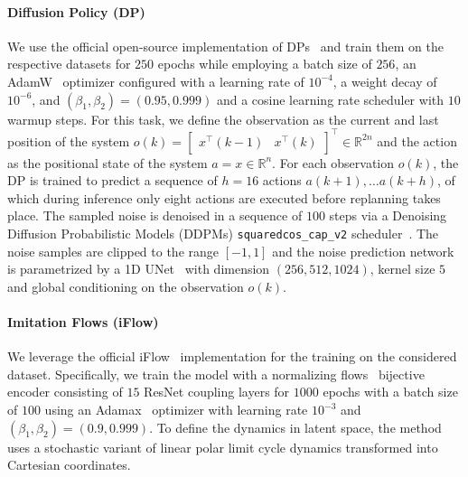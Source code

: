\paragraph{Diffusion Policy (DP)}
We use the official open-source implementation of \glspl{DP}~\citep{chi2023diffusion} and train them on the respective datasets for $250$ epochs while employing a batch size of $256$, an AdamW~\citep{kingma2014adam, loshchilov2018decoupled} optimizer configured with a learning rate of $10^{-4}$, a weight decay of $10^{-6}$, and $(\beta_1, \beta_2) = (0.95, 0.999)$ and a cosine learning rate scheduler with $10$ warmup steps. For this task, we define the observation as the current and last position of the system $o(k) = \begin{bmatrix}
    x^\top(k-1) & x^\top(k)
\end{bmatrix}^\top \in \mathbb{R}^{2n}$ and the action as the positional state of the system $a = x \in \mathbb{R}^{n}$. For each observation $o(k)$, the DP is trained to predict a sequence of $h=16$ actions $a(k+1), \dots a(k+h)$, of which during inference only eight actions are executed before replanning takes place.
The sampled noise is denoised in a sequence of $100$ steps via a Denoising Diffusion Probabilistic Models (DDPMs) \texttt{squaredcos\_cap\_v2} scheduler~\citep{ho2020denoising}. 
The noise samples are clipped to the range $[-1, 1]$ and the noise prediction network is parametrized by a 1D UNet~\citep{ronneberger2015u} with dimension $(256, 512, 1024)$, kernel size $5$ and global conditioning on the observation $o(k)$. 

\paragraph{Imitation Flows (iFlow)}
We leverage the official iFlow~\citep{urain2020imitationflow} implementation for the training on the considered dataset. Specifically, we train the model with a normalizing flows~\citep{rezende2015variational} bijective encoder consisting of $15$ ResNet coupling layers for $1000$ epochs with a batch size of $100$ using an Adamax~\citep{kingma2014adam} optimizer with learning rate $10^{-3}$ and $(\beta_1, \beta_2) = (0.9, 0.999)$.
To define the dynamics in latent space, the method uses a stochastic variant of linear polar limit cycle dynamics transformed into Cartesian coordinates.


